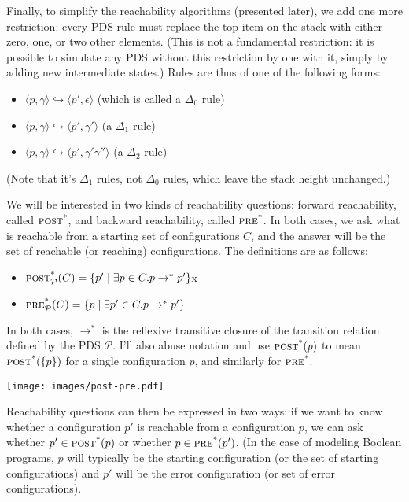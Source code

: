 \documentclass{article}
\newcommand{\Config}[2]{\ensuremath{\langle #1, #2 \rangle}}
\newcommand{\Rule}[2]{\ensuremath{#1 \hookrightarrow #2}}
\newcommand{\poststar}{\ensuremath{\textsc{post}^\textsc{*}}}
\newcommand{\prestar}{\ensuremath{\textsc{pre}^\textsc{*}}}
\begin{document}
Finally, to simplify the reachability algorithms (presented later), we
add one more restriction: every PDS rule must replace the top item on
the stack with either zero, one, or two other elements. (This is not a
fundamental restriction: it is possible to simulate any PDS without
this restriction by one with it, simply by adding new intermediate
states.) Rules are thus of one of the following forms:
\begin{itemize}
\item \Rule{\Config{p}{\gamma}}{\Config{p'}{\epsilon}} (which is called a
$\Delta_0$ rule)
\item \Rule{\Config{p}{\gamma}}{\Config{p'}{\gamma'}} (a $\Delta_1$
  rule)
\item \Rule{\Config{p}{\gamma}}{\Config{p'}{\gamma'\gamma''}} (a
  $\Delta_2$ rule)
\end{itemize}

(Note that it's $\Delta_1$ rules, not $\Delta_0$ rules, which leave
the stack height unchanged.)

We will be interested in two kinds of reachability questions: forward
reachability, called \poststar, and backward reachability, called
\prestar. In both cases, we ask what is reachable from a starting set
of configurations $C$, and the answer will be the set of reachable (or
reaching) configurations. The definitions are as follows:
\begin{itemize}
\item $\poststar_{\mathcal{P}}(C) = \{p' \mid \exists p\in C. p \rightarrow^*
  p'\}$x
\item $\prestar_{\mathcal{P}}(C) = \{p \mid \exists p'\in C. p \rightarrow^*
  p'\}$
\end{itemize}
In both cases, $\rightarrow^*$ is the reflexive transitive closure of
the transition relation defined by the PDS $\mathcal{P}$. I'll also
abuse notation and use $\poststar(p)$ to mean $\poststar(\{p\})$ for a
single configuration $p$, and similarly for \prestar.

\begin{center}
  \texttt{[image: images/post-pre.pdf]}
\end{center}

Reachability questions can then be expressed in two ways: if we want
to know whether a configuration $p'$ is reachable from a configuration
$p$, we can ask whether $p' \in \poststar(p)$ or whether $p \in
\prestar(p')$. (In the case of modeling Boolean programs, $p$ will
typically be the starting configuration (or the set of starting
configurations) and $p'$ will be the error configuration (or set of
error configurations).
\end{document}
